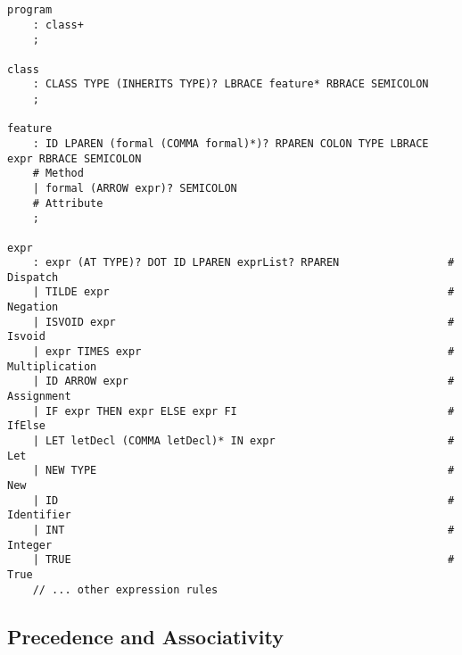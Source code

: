 \documentclass[titlepage]{article}
\begin{document}
\begin{lstlisting}
program
    : class+                                                                                               
    ;                                                                                                      
                                                                                                           
class
    : CLASS TYPE (INHERITS TYPE)? LBRACE feature* RBRACE SEMICOLON                                         
    ;                                                                                                      
                                                                                                           
feature
    : ID LPAREN (formal (COMMA formal)*)? RPAREN COLON TYPE LBRACE expr RBRACE SEMICOLON
    # Method         
    | formal (ARROW expr)? SEMICOLON
    # Attribute      
    ;                                                                                                      
                                                                                                           
expr
    : expr (AT TYPE)? DOT ID LPAREN exprList? RPAREN                 # Dispatch                            
    | TILDE expr                                                     # Negation                            
    | ISVOID expr                                                    # Isvoid                              
    | expr TIMES expr                                                # Multiplication                      
    | ID ARROW expr                                                  # Assignment                          
    | IF expr THEN expr ELSE expr FI                                 # IfElse                              
    | LET letDecl (COMMA letDecl)* IN expr                           # Let                                 
    | NEW TYPE                                                       # New                                 
    | ID                                                             # Identifier                          
    | INT                                                            # Integer                             
    | TRUE                                                           # True                                
    // ... other expression rules
\end{lstlisting}

\subsection{Precedence and Associativity}
\end{document}
